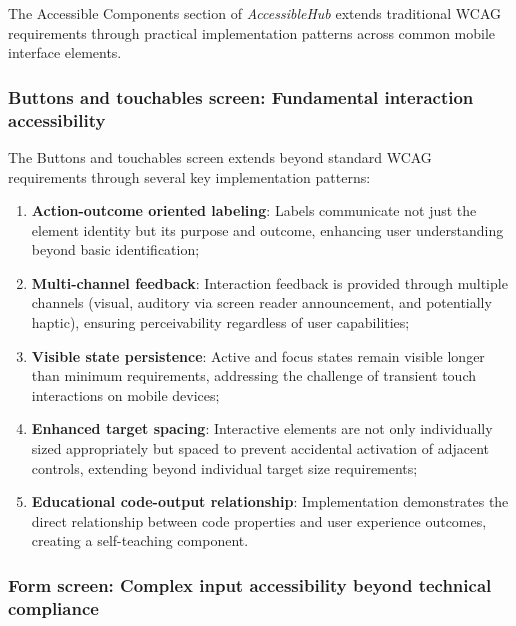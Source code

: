 The Accessible Components section of \textit{AccessibleHub} extends traditional WCAG requirements through practical implementation patterns across common mobile interface elements. 

\subsubsection{Buttons and touchables screen: Fundamental interaction accessibility}
\label{subsubsec:buttons-touchables-beyond-wcag}

The Buttons and touchables screen extends beyond standard WCAG requirements through several key implementation patterns:

\begin{enumerate}
    \item \textbf{Action-outcome oriented labeling}: Labels communicate not just the element identity but its purpose and outcome, enhancing user understanding beyond basic identification;
    
    \item \textbf{Multi-channel feedback}: Interaction feedback is provided through multiple channels (visual, auditory via screen reader announcement, and potentially haptic), ensuring perceivability regardless of user capabilities;
    
    \item \textbf{Visible state persistence}: Active and focus states remain visible longer than minimum requirements, addressing the challenge of transient touch interactions on mobile devices;
    
    \item \textbf{Enhanced target spacing}: Interactive elements are not only individually sized appropriately but spaced to prevent accidental activation of adjacent controls, extending beyond individual target size requirements;
    
    \item \textbf{Educational code-output relationship}: Implementation demonstrates the direct relationship between code properties and user experience outcomes, creating a self-teaching component.
\end{enumerate}

\subsubsection{Form screen: Complex input accessibility beyond technical compliance}
\label{subsubsec:forms-beyond-wcag}

